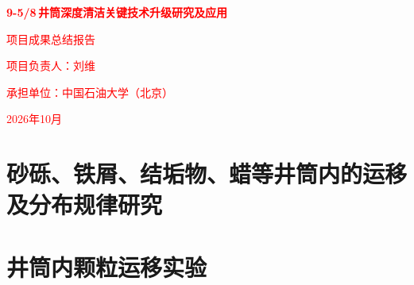\documentclass[12pt, a4paper, zihao=-4, openright]{ctexrep}
\newcommand{\inch}{\,\text{''}} %
\begin{document}




\begin{titlepage}
    \centering 
    \vspace*{4cm} 
    {\Huge \bfseries \textcolor{red}{9-5/8\inch 井筒深度清洁关键技术升级研究及应用} \par} 
    \vspace{2cm} 
    {\Large \textcolor{red}{项目成果总结报告} \par} 
    \vspace{4cm} 
    {\Large \textcolor{red}{项目负责人：刘维} \par}
    \vspace{1cm}
    {\Large \textcolor{red}{承担单位：中国石油大学（北京）} \par}
    \vspace{1cm}
    {\Large \textcolor{red}{2026年10月} \par}
\end{titlepage}

\clearpage
{} 
\tableofcontents

\clearpage
{} 
\setcounter{page}{1}   


%

\chapter{砂砾、铁屑、结垢物、蜡等井筒内的运移及分布规律研究}
\chapter{井筒内颗粒运移实验}
\end{document}
